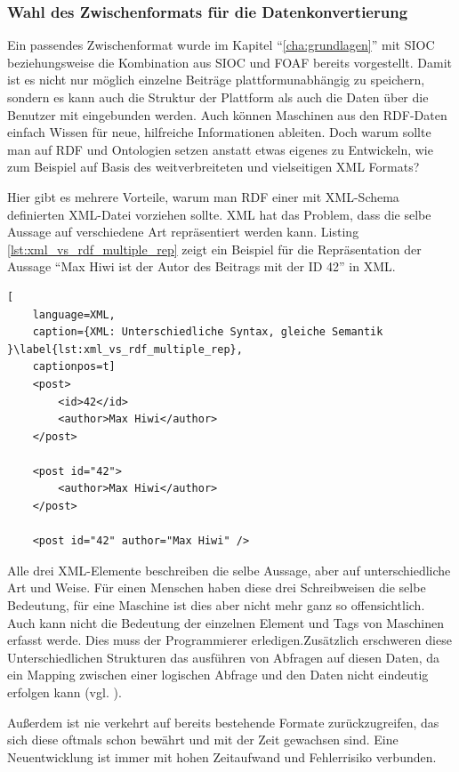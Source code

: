 \subsubsection{Wahl des Zwischenformats für die Datenkonvertierung} %
\label{ssub:wahl_des_zwischenformats_für_die_datenkonvertierung}

Ein passendes Zwischenformat wurde im Kapitel \enquote{\ref{cha:grundlagen}} mit SIOC beziehungsweise die Kombination aus SIOC und FOAF bereits vorgestellt. Damit ist es nicht nur möglich einzelne Beiträge plattformunabhängig zu speichern, sondern es kann auch die Struktur der Plattform als auch die Daten über die Benutzer mit eingebunden werden. Auch können Maschinen aus den RDF-Daten einfach Wissen für neue, hilfreiche Informationen ableiten. Doch warum sollte man auf RDF und Ontologien setzen anstatt etwas eigenes zu Entwickeln, wie zum Beispiel auf Basis des weitverbreiteten und vielseitigen XML Formats?

Hier gibt es mehrere Vorteile, warum man RDF einer mit XML-Schema definierten XML-Datei vorziehen sollte. XML hat das Problem, dass die selbe Aussage auf verschiedene Art repräsentiert werden kann. Listing \ref{lst:xml_vs_rdf_multiple_rep} zeigt ein Beispiel für die Repräsentation der Aussage \enquote{Max Hiwi ist der Autor des Beitrags mit der ID 42} in XML.

\begin{lstlisting}[
    language=XML,
    caption={XML: Unterschiedliche Syntax, gleiche Semantik }\label{lst:xml_vs_rdf_multiple_rep},
    captionpos=t]
    <post>
        <id>42</id>
        <author>Max Hiwi</author>
    </post>

    <post id="42">
        <author>Max Hiwi</author>
    </post>

    <post id="42" author="Max Hiwi" />
\end{lstlisting}

Alle drei XML-Elemente beschreiben die selbe Aussage, aber auf unterschiedliche Art und Weise. Für einen Menschen haben diese drei Schreibweisen die selbe Bedeutung, für eine Maschine ist dies aber nicht mehr ganz so offensichtlich. Auch kann nicht die Bedeutung der einzelnen Element und Tags von Maschinen erfasst werde. Dies muss der Programmierer erledigen.Zusätzlich erschweren diese Unterschiedlichen Strukturen das ausführen von Abfragen auf diesen Daten, da ein Mapping zwischen einer logischen Abfrage und den Daten nicht eindeutig erfolgen kann (vgl. \cite[s.\,41]{Schroder2003a}).

Außerdem ist nie verkehrt auf bereits bestehende Formate zurückzugreifen, das sich diese oftmals schon bewährt und mit der Zeit gewachsen sind. Eine Neuentwicklung ist immer mit hohen Zeitaufwand und Fehlerrisiko verbunden.

